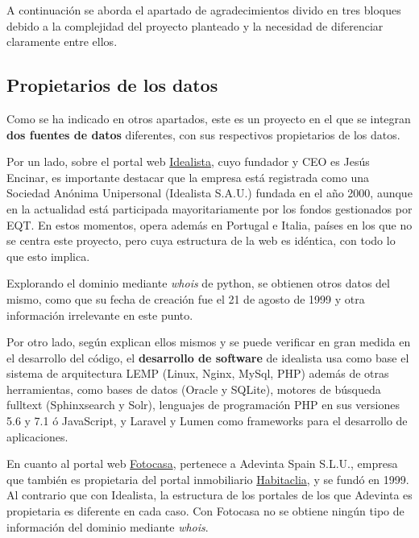 \documentclass[12pt]{article}
\begin{document}
A continuación se aborda el apartado de agradecimientos divido en tres bloques debido a la complejidad del proyecto planteado y la necesidad de diferenciar claramente entre ellos. 

\vspace{-1.5em}\subsection*{Propietarios de los datos}\vspace{-1.0em}

Como se ha indicado en otros apartados, este es un proyecto en el que se integran \textbf{dos fuentes de datos} diferentes, con sus respectivos propietarios de los datos. 

Por un lado, sobre el portal web \href{http://www.idealista.com}{Idealista}, cuyo fundador y CEO es Jesús Encinar, es importante destacar que la empresa está registrada como una Sociedad Anónima Unipersonal (Idealista S.A.U.) fundada en el año 2000, aunque en la actualidad está participada mayoritariamente por los fondos gestionados por EQT. En estos momentos, opera además en Portugal e Italia, países en los que no se centra este proyecto, pero cuya estructura de la web es idéntica, con todo lo que esto implica. 

Explorando el dominio mediante \textit{whois} de python, se obtienen otros datos del mismo, como que su fecha de creación fue el 21 de agosto de 1999 y otra información irrelevante en este punto.

Por otro lado, según explican ellos mismos y se puede verificar en gran medida en el desarrollo del código, el \textbf{desarrollo de software} de idealista usa como base el sistema de arquitectura LEMP (Linux, Nginx, MySql, PHP) además de otras herramientas, como bases de datos (Oracle y SQLite), motores de búsqueda fulltext (Sphinxsearch y Solr), lenguajes de programación PHP en sus versiones 5.6 y 7.1 ó JavaScript, y Laravel y Lumen como frameworks para el desarrollo de aplicaciones.

En cuanto al portal web \href{https://www.fotocasa.es/es/}{Fotocasa}, pertenece a Adevinta Spain S.L.U., empresa que también es propietaria del portal inmobiliario \href{https://www.habitaclia.com/madrid}{Habitaclia}, y se fundó en 1999. Al contrario que con Idealista, la estructura de los portales de los que Adevinta es propietaria es diferente en cada caso. Con Fotocasa no se obtiene ningún tipo de información del dominio mediante \textit{whois}. 
\end{document}
